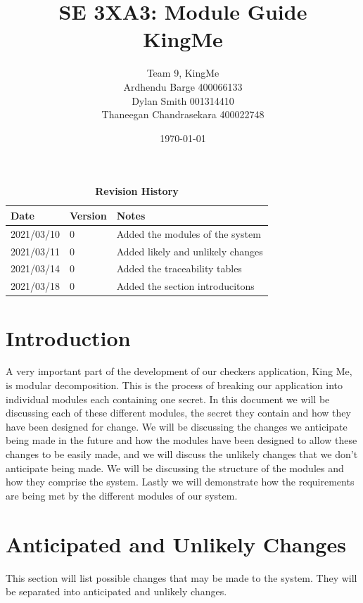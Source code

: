 \documentclass[12pt, titlepage]{article}
\title{SE 3XA3: Module Guide\\KingMe}
\author{Team 9, KingMe
		\\ Ardhendu Barge 400066133
		\\ Dylan Smith 001314410
		\\ Thaneegan Chandrasekara 400022748
}
\date{\today}
\begin{document}
\maketitle

\tableofcontents
\listoftables
\listoffigures

\begin{table}[!ht]
\caption{\bf Revision History}
\begin{tabularx}{\textwidth}{p{3cm}p{2cm}X}
\toprule {\bf Date} & {\bf Version} & {\bf Notes}\\
\midrule
2021/03/10 & 0 & Added the modules of the system\\
2021/03/11 & 0 & Added likely and unlikely changes\\
2021/03/14 & 0 & Added the traceability tables\\
2021/03/18 & 0 & Added the section introducitons\\
\bottomrule
\end{tabularx}
\end{table}

\newpage


\section{Introduction}

A very important part of the development of our checkers application, King Me, is modular decomposition. This is the process of breaking our application into individual modules each containing one secret. In this document we will be discussing each of these different modules, the secret they contain and how they have been designed for change. We will be discussing the changes we anticipate being made in the future and how the modules have been designed to allow these changes to be easily made, and we will discuss the unlikely changes that we don't anticipate being made. We will be discussing the structure of the modules and how they comprise the system. Lastly we will demonstrate how the requirements are being met by the different modules of our system.

\section{Anticipated and Unlikely Changes} \label{SecChange}
This section will list possible changes that may be made to the system. They will be separated into anticipated and unlikely changes.
\end{document}
